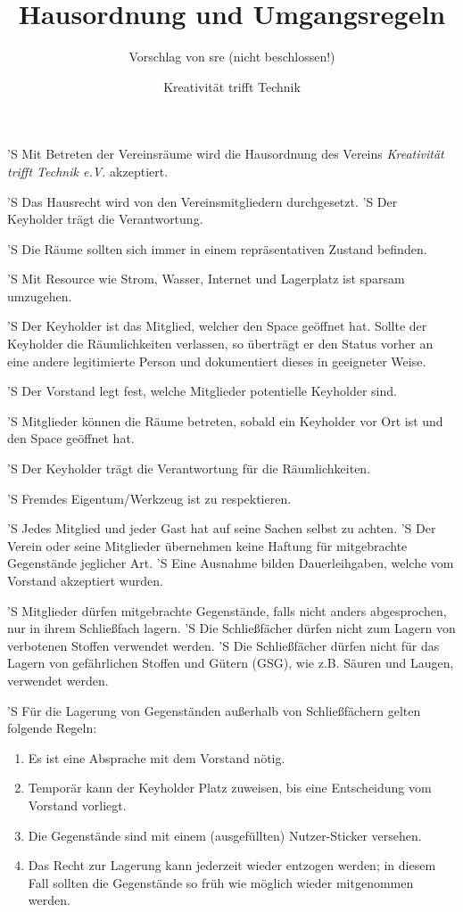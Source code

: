 \documentclass[a4paper,10pt]{scrreprt}
\begin{document}
\title{Hausordnung und Umgangsregeln}
\subtitle{Vorschlag von sre (nicht beschlossen!)}
\author{Kreativität trifft Technik}



\begin{contract}


'S Mit Betreten der Vereinsräume wird die Hausordnung des
Vereins \textit{Kreativität trifft Technik e.V.} akzeptiert.

'S Das Hausrecht wird von den Vereinsmitgliedern durchgesetzt.
'S Der Keyholder trägt die Verantwortung.

'S Die Räume sollten sich immer in einem repräsentativen Zustand befinden.

'S Mit Resource wie Strom, Wasser, Internet und Lagerplatz ist sparsam umzugehen.


'S Der Keyholder ist das Mitglied, welcher den Space geöffnet hat. Sollte der
Keyholder die Räumlichkeiten verlassen, so überträgt er den Status vorher an
eine andere legitimierte Person und dokumentiert dieses in geeigneter Weise.

'S Der Vorstand legt fest, welche Mitglieder potentielle Keyholder sind.

'S Mitglieder können die Räume betreten, sobald ein Keyholder vor Ort ist
und den Space geöffnet hat.

'S Der Keyholder trägt die Verantwortung für die Räumlichkeiten.


'S Fremdes Eigentum/Werkzeug ist zu respektieren.

'S Jedes Mitglied und jeder Gast hat auf seine Sachen selbst zu achten.
'S Der Verein oder seine Mitglieder übernehmen keine Haftung für mitgebrachte
Gegenstände jeglicher Art.
'S Eine Ausnahme bilden Dauerleihgaben, welche vom Vorstand akzeptiert wurden.

'S Mitglieder dürfen mitgebrachte Gegenstände, falls nicht anders abgesprochen,
nur in ihrem Schließfach lagern.
'S Die Schließfächer dürfen nicht zum Lagern von verbotenen Stoffen verwendet
werden.
'S Die Schließfächer dürfen nicht für das Lagern von gefährlichen Stoffen und
Gütern (GSG), wie z.B. Säuren und Laugen, verwendet werden.

'S Für die Lagerung von Gegenständen außerhalb von Schließfächern gelten folgende
Regeln:
\begin{enumerate}
	\item Es ist eine Absprache mit dem Vorstand nötig.
	\item Temporär kann der Keyholder Platz zuweisen, bis eine Entscheidung
	vom Vorstand vorliegt.
	\item Die Gegenstände sind mit einem (ausgefüllten) Nutzer-Sticker versehen.
	\item Das Recht zur Lagerung kann jederzeit wieder entzogen werden; in diesem
	Fall sollten die Gegenstände so früh wie möglich wieder mitgenommen werden.
\end{enumerate}


\end{contract}
\end{document}

